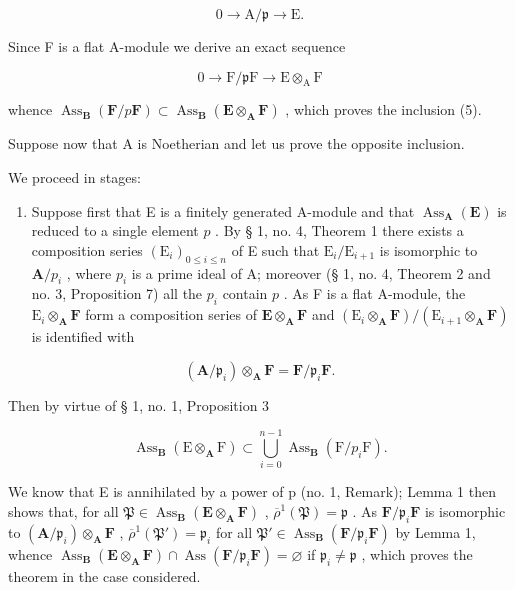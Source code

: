 \[
0 \rightarrow \mathrm{A} / \mathfrak {p} \rightarrow \mathrm{E}.
\]

Since F is a flat A-module we derive an exact sequence

\[
0 \rightarrow \mathrm{F} / \mathfrak {p} \mathrm{F} \rightarrow \mathrm{E} \otimes_ {\mathrm{A}} \mathrm{F}
\]

whence \(\operatorname{Ass}_{\mathbf{B}}(\mathbf{F} / p\mathbf{F})\subset \operatorname{Ass}_{\mathbf{B}}(\mathbf{E}\otimes_{\mathbf{A}}\mathbf{F})\) , which proves the inclusion (5).

Suppose now that A is Noetherian and let us prove the opposite inclusion.

We proceed in stages:

\begin{enumerate}
\def\labelenumi{(\roman{enumi})}
\tightlist
\item
  Suppose first that E is a finitely generated A-module and that \(\operatorname{Ass}_{\mathbf{A}}(\mathbf{E})\) is reduced to a single element \(p\) . By § 1, no. 4, Theorem 1 there exists a composition series \((\mathrm{E}_i)_{0 \leqslant i \leqslant n}\) of E such that \(\mathrm{E}_i / \mathrm{E}_{i+1}\) is isomorphic to \(\mathbf{A} / p_i\) , where \(p_i\) is a prime ideal of A; moreover (§ 1, no. 4, Theorem 2 and no. 3, Proposition 7) all the \(p_i\) contain \(p\) . As F is a flat A-module, the \(\mathrm{E}_i \otimes_{\mathbf{A}} \mathbf{F}\) form a composition series of \(\mathbf{E} \otimes_{\mathbf{A}} \mathbf{F}\) and \((\mathrm{E}_i \otimes_{\mathbf{A}} \mathbf{F}) / (\mathrm{E}_{i+1} \otimes_{\mathbf{A}} \mathbf{F})\) is identified with
\end{enumerate}

\[
(\mathbf {A} / \mathfrak {p} _ {i}) \otimes_ {\mathbf {A}} \mathbf {F} = \mathbf {F} / \mathfrak {p} _ {i} \mathbf {F}.
\]

Then by virtue of § 1, no. 1, Proposition 3

\[
\operatorname{Ass} _ {\mathbf {B}} (\mathrm{E} \otimes_ {\mathbf {A}} \mathrm{F}) \subset \bigcup_ {i = 0} ^ {n - 1} \operatorname{Ass} _ {\mathbf {B}} (\mathrm{F} / p _ {i} \mathrm{F}).
\]

We know that E is annihilated by a power of p (no. 1, Remark); Lemma 1 then shows that, for all \(\mathfrak{P} \in \operatorname{Ass}_{\mathbf{B}}(\mathbf{E} \otimes_{\mathbf{A}} \mathbf{F})\) , \(\overline{\rho}^{1}(\mathfrak{P}) = \mathfrak{p}\) . As \(\mathbf{F} / \mathfrak{p}_i \mathbf{F}\) is isomorphic to \((\mathbf{A} / \mathfrak{p}_i) \otimes_{\mathbf{A}} \mathbf{F}\) , \(\overline{\rho}^{1}(\mathfrak{P}') = \mathfrak{p}_i\) for all \(\mathfrak{P}' \in \operatorname{Ass}_{\mathbf{B}}(\mathbf{F} / \mathfrak{p}_i \mathbf{F})\) by Lemma 1, whence \(\operatorname{Ass}_{\mathbf{B}}(\mathbf{E} \otimes_{\mathbf{A}} \mathbf{F}) \cap \operatorname{Ass}(\mathbf{F} / \mathfrak{p}_i \mathbf{F}) = \varnothing\) if \(\mathfrak{p}_i \neq \mathfrak{p}\) , which proves the theorem in the case considered.


